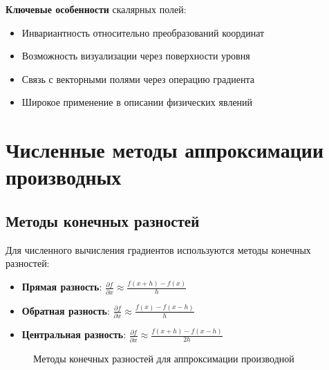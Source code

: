 \documentclass[12pt]{article}
\begin{document}
	\textbf{Ключевые особенности} скалярных полей:
	\begin{itemize}
		\item Инвариантность относительно преобразований координат
		\item Возможность визуализации через поверхности уровня
		\item Связь с векторными полями через операцию градиента
		\item Широкое применение в описании физических явлений
	\end{itemize}
	
	
	
	\section{Численные методы аппроксимации производных}
	
	\subsection{Методы конечных разностей}
	
	Для численного вычисления градиентов используются методы конечных разностей:
	
	\begin{itemize}
		\item \textbf{Прямая разность}: $\frac{\partial f}{\partial x} \approx \frac{f(x+h) - f(x)}{h}$
		\item \textbf{Обратная разность}: $\frac{\partial f}{\partial x} \approx \frac{f(x) - f(x-h)}{h}$
		\item \textbf{Центральная разность}: $\frac{\partial f}{\partial x} \approx \frac{f(x+h) - f(x-h)}{2h}$
	\end{itemize}
	
	\begin{figure}[H]
		\centering
		\caption{Методы конечных разностей для аппроксимации производной}
	\end{figure}
	
\end{document}
